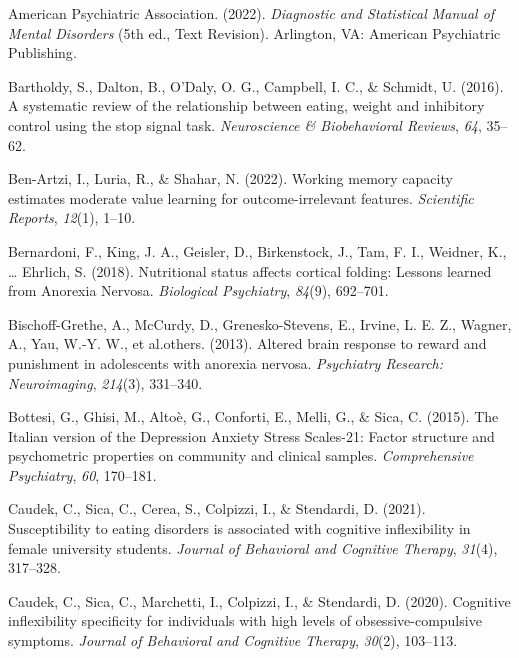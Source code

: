 \documentclass[
  man,floatsintext]{apa6}
\newlength{\cslhangindent}
\newlength{\cslentryspacingunit} %
\newenvironment{CSLReferences}[2] %
 {%
  \setlength{\parindent}{0pt}
  \ifodd #1
  \let\oldpar\par
  \def\par{\hangindent=\cslhangindent\oldpar}
  \fi
  \setlength{\parskip}{#2\cslentryspacingunit}
 }%
 {}
\begin{document}
\hypertarget{refs}{}
\begin{CSLReferences}{1}{0}
\leavevmode{}%
American Psychiatric Association. (2022). \emph{{Diagnostic and Statistical Manual of Mental Disorders}} (5th ed., Text Revision). Arlington, VA: {American Psychiatric Publishing}.

\leavevmode{}%
Bartholdy, S., Dalton, B., O'Daly, O. G., Campbell, I. C., \& Schmidt, U. (2016). A systematic review of the relationship between eating, weight and inhibitory control using the stop signal task. \emph{Neuroscience \& Biobehavioral Reviews}, \emph{64}, 35--62.

\leavevmode{}%
Ben-Artzi, I., Luria, R., \& Shahar, N. (2022). Working memory capacity estimates moderate value learning for outcome-irrelevant features. \emph{Scientific Reports}, \emph{12}(1), 1--10.

\leavevmode{}%
Bernardoni, F., King, J. A., Geisler, D., Birkenstock, J., Tam, F. I., Weidner, K., \ldots{} Ehrlich, S. (2018). Nutritional status affects cortical folding: {Lessons} learned from {Anorexia} {Nervosa}. \emph{Biological Psychiatry}, \emph{84}(9), 692--701.

\leavevmode{}%
Bischoff-Grethe, A., McCurdy, D., Grenesko-Stevens, E., Irvine, L. E. Z., Wagner, A., Yau, W.-Y. W., et al.others. (2013). Altered brain response to reward and punishment in adolescents with anorexia nervosa. \emph{Psychiatry Research: Neuroimaging}, \emph{214}(3), 331--340.

\leavevmode{}%
Bottesi, G., Ghisi, M., Altoè, G., Conforti, E., Melli, G., \& Sica, C. (2015). {The Italian version of the Depression Anxiety Stress Scales-21: Factor structure and psychometric properties on community and clinical samples}. \emph{Comprehensive Psychiatry}, \emph{60}, 170--181.

\leavevmode{}%
Caudek, C., Sica, C., Cerea, S., Colpizzi, I., \& Stendardi, D. (2021). Susceptibility to eating disorders is associated with cognitive inflexibility in female university students. \emph{Journal of Behavioral and Cognitive Therapy}, \emph{31}(4), 317--328.

\leavevmode{}%
Caudek, C., Sica, C., Marchetti, I., Colpizzi, I., \& Stendardi, D. (2020). Cognitive inflexibility specificity for individuals with high levels of obsessive-compulsive symptoms. \emph{Journal of Behavioral and Cognitive Therapy}, \emph{30}(2), 103--113.


\end{CSLReferences}
\end{document}
